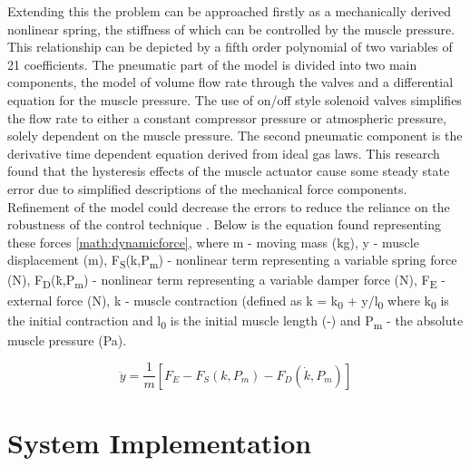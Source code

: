 \documentclass[11pt,a4paper]{article}
\begin{document}
Extending this the problem can be approached firstly as a mechanically derived nonlinear spring, the stiffness of which can be controlled by the muscle pressure. This relationship can be depicted by a fifth order polynomial of two variables of 21 coefficients. The pneumatic part of the model is divided into two main components, the model of volume flow rate through the valves and a differential equation for the muscle pressure. The use of on/off style solenoid valves simplifies the flow rate to either a constant compressor pressure or atmospheric pressure, solely dependent on the muscle pressure. The second pneumatic component is the derivative time dependent equation derived from ideal gas laws. This research found that the hysteresis effects of the muscle actuator cause some steady state error due to simplified descriptions of the mechanical force components. Refinement of the model could decrease the errors to reduce the reliance on the robustness of the control technique \cite{hosovsky_2012}. Below is the equation found representing these forces \cref{math:dynamicforce}, where m - moving mass (kg), y - muscle displacement (m), F\textsubscript{S}(k,P\textsubscript{m}) - nonlinear term representing a variable spring force (N), F\textsubscript{D}(\.{k},P\textsubscript{m}) - nonlinear term representing a variable damper force (N), F\textsubscript{E} - external force (N), k - muscle contraction (defined as k = k\textsubscript{0} + y/l\textsubscript{0} where k\textsubscript{0} is the initial contraction and l\textsubscript{0} is the initial muscle length (-) and P\textsubscript{m} - the absolute muscle pressure (Pa).

\begin{equation}
    \ddot{y} = \frac{1}{m}[F_E-F_S(k,P_m)-F_D(\dot{k},P_m)]
    \label{math:dynamicforce}
\end{equation}

\newpage
\section{System Implementation}
\label{sec:system_implementation}
\end{document}
